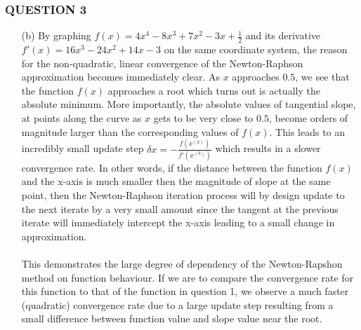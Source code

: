 \documentclass{article}
\begin{document}
\subsubsection*{QUESTION 3}

\begin{enumerate}


    \item[(b)] By graphing $f(x)=4x^{4}-8x^{3}+7x^{2}-3x+\frac{1}{2}$ and its derivative $f'(x)=16x^{3}-24x^{2}+14x-3$ on the same
               coordinate system, the reason for the non-quadratic, linear convergence of the Newton-Raphson approximation becomes
               immediately clear. As $x$ approaches $0.5$, we see that the function $f(x)$ approaches a root which turns out is actually
               the absolute minimum. More importantly, the absolute values of tangential slope, at points along the curve as $x$
               gets to be very close to $0.5$, become orders of magnitude larger than the corresponding values of $f(x)$. This leads to
               an incredibly small update step $\delta{x}=-\frac{f(x^{(k)})}{f'(x^{(k)})}$ which results in a slower convergence rate.
               In other words, if the distance between the function $f(x)$ and the x-axis is much smaller then the magnitude of slope
               at the same point, then the Newton-Raphson iteration process will by design update to the next iterate by a very small
               amount since the tangent at the previous iterate will immediately intercept the x-axis leading to a small change in
               approximation.\\
               \\
               This demonstrates the large degree of dependency of the Newton-Rapshon method on function behaviour. If we are to compare
               the convergence rate for this function to that of the function in question 1, we observe a much faster (quadratic)
               convergence rate due to a large update step resulting from a small difference between function value and slope value near
               the root.



\end{enumerate}
\end{document}
